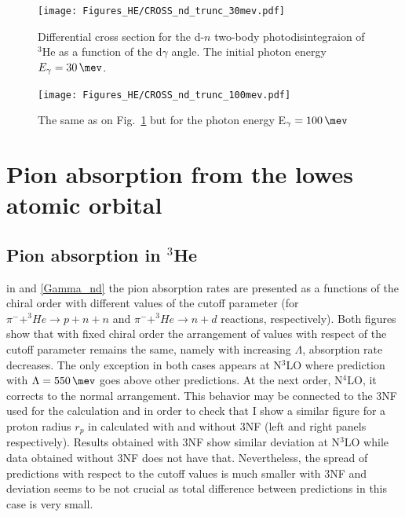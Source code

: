 \begin{figure}[h]
    \begin{center}
        \texttt{[image: Figures\_HE/CROSS\_nd\_trunc\_30mev.pdf]}
        \end{center}
        \caption{Differential cross section for the d-$n$ 
        two-body photodisintegraion of $^3$He as a function of the d$\gamma$ angle.
        The initial photon energy $E_\gamma=\SI{30}{\mev}$.}
        \label{CROSS_nd_30}
    \end{figure}


    \begin{figure}[h]
        \begin{center}
        \texttt{[image: Figures\_HE/CROSS\_nd\_trunc\_100mev.pdf]}
        \end{center}
        \caption{The same as on Fig.~\ref{CROSS_nd_30} but 
        for the photon energy E$_\gamma=\SI{100}{\mev}$}
        \label{CROSS_nd_100}
    \end{figure}

    \clearpage
    \section{Pion absorption from the lowes atomic orbital}

    \subsection{Pion absorption in $^3$He}

    in  and \ref{Gamma_nd} the pion absorption rates are presented as a functions
    of the chiral order with different values of the cutoff parameter
    (for $\pi^- + ^3He \rightarrow p + n + n$ and $\pi^- + ^3He \rightarrow n + d$ reactions, respectively).
    Both figures show that with fixed chiral order the arrangement of values with respect of the cutoff parameter
    remains the same, namely with increasing $\Lambda$, absorption rate decreases. The only exception in both cases 
    appears at N$^3$LO where prediction with $\Lambda = \SI{550}{\mev}$ goes above other predictions.
    At the next order, N$^4$LO, it corrects to the normal arrangement.
    This behavior may be connected to the 3NF used for the calculation and in order to check that I show
    a similar figure for a proton radius $r_p$ in  calculated with 
    and without 3NF (left and right panels respectively). Results obtained with 3NF show
    similar deviation at N$^3$LO while data obtained without 3NF does not have that.
    Nevertheless, the spread of predictions with respect to the cutoff values is much smaller
    with 3NF and deviation seems to be not crucial as total difference
    between predictions in this case is very small.




